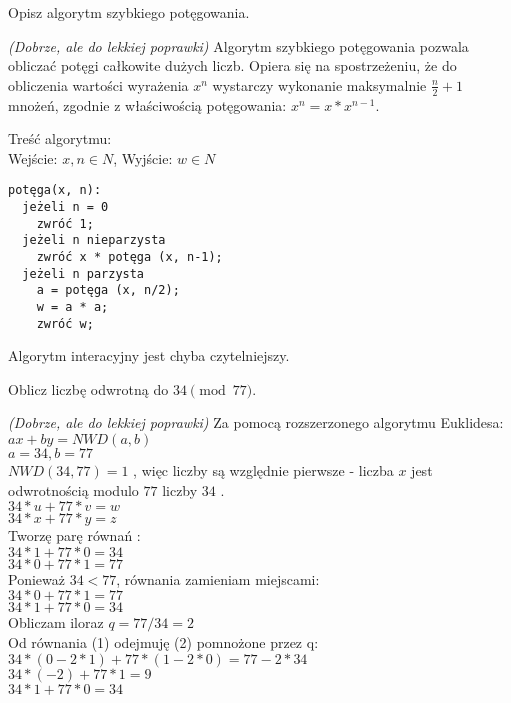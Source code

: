 \documentclass[answers,11pt]{exam}
\newcommand{\fixit}{\textit{(Dobrze, ale do lekkiej poprawki)} }
\begin{document}
\begin{questions}
\question Opisz algorytm szybkiego potęgowania.
\begin{solution}
\fixit
Algorytm szybkiego potęgowania pozwala obliczać potęgi całkowite dużych liczb. Opiera się na spostrzeżeniu, że do obliczenia wartości wyrażenia $x^n$ wystarczy wykonanie maksymalnie $\frac{n}{2} + 1$ mnożeń, zgodnie z właściwością potęgowania: $x^n = x * x^{n-1}$.

\medskip
Treść algorytmu:\\
Wejście: $x,n \in N$,
Wyjście: $w \in N$
\begin{verbatim}
potęga(x, n):
  jeżeli n = 0 
    zwróć 1;
  jeżeli n nieparzysta
    zwróć x * potęga (x, n-1);
  jeżeli n parzysta
    a = potęga (x, n/2);
    w = a * a;
    zwróć w;
\end{verbatim}

Algorytm interacyjny jest chyba czytelniejszy.

\end{solution}

\question Oblicz liczbę odwrotną do $34 \pmod{77}$.
\begin{solution}
\fixit
Za pomocą rozszerzonego algorytmu Euklidesa:\\

$ax + by = NWD(a,b)$\\
$a = 34, b = 77$\\

$NWD(34,77) = 1$ , więc liczby są względnie pierwsze - liczba $x$ jest odwrotnością modulo $77$ liczby $34$ .\\ 

$ 34 * u + 77 * v = w$\\
$ 34 * x + 77 * y = z$\\

Tworzę parę równań :\\
$ 34 * 1 + 77 * 0 = 34$\\
$ 34 * 0 + 77 * 1 = 77$\\

Ponieważ $34 < 77$, równania zamieniam miejscami:\\
$ 34 * 0 + 77 * 1 = 77$\\
$ 34 * 1 + 77 * 0 = 34$\\
Obliczam iloraz $q = 77 / 34 = 2$\\
Od równania (1) odejmuję (2) pomnożone przez q:\\
$ 34 * (0 - 2 * 1)  + 77 * (1 - 2 * 0) = 77 - 2 * 34$\\
$ 34 * (-2) + 77 * 1 = 9$\\
$ 34 * 1 + 77 * 0 = 34$\\


\end{solution}
\end{questions}
\end{document}
